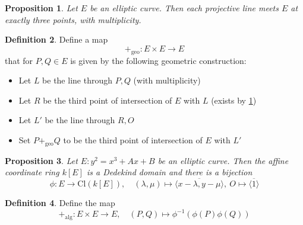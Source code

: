 \documentclass{scrartcl}
\renewcommand{\O}{O}
\newtheorem{prop}{Proposition}[section]
\theoremstyle{definition}
\newtheorem{definition}[prop]{Definition}
\begin{document}
\begin{prop}
    \label{prop:bezout_theorem_case}
    Let $E$ be an elliptic curve. Then each projective line meets $E$ at exactly three points, with multiplicity.
\end{prop}

\begin{definition}
    Define a map
    \begin{equation*}
        +_{\mathrm{geo}}: E \times E \to E
    \end{equation*}
    that for $P, Q \in E$ is given by the following geometric construction:
    \begin{itemize}
        \item Let $L$ be the line through $P, Q$ (with multiplicity)
        \item Let $R$ be the third point of intersection of $E$ with $L$ (exists by \ref{prop:bezout_theorem_case})
        \item Let $L'$ be the line through $R, \O$
        \item Set $P +_{\mathrm{geo}} Q$ to be the third point of intersection of $E$ with $L'$
    \end{itemize}
\end{definition}

\begin{prop}
    \label{prop:dedekind_domain}
    Let $E: y^2 = x^3 + Ax + B$ be an elliptic curve. Then the affine coordinate ring $k[E]$ is a Dedekind domain and there is a bijection
    \begin{equation*}
        \phi: E \to \mathrm{Cl}(k[E]), \quad (\lambda, \mu) \mapsto \overline{\langle x - \lambda, y - \mu \rangle}, \ \O \mapsto \overline{\langle 1 \rangle}
    \end{equation*}
\end{prop}

\begin{definition}
    Define the map
    \begin{equation*}
        +_{\mathrm{alg}}: E \times E \to E, \quad (P, Q) \mapsto  \phi^{-1}(\phi(P) \phi(Q))
    \end{equation*}
\end{definition}
\end{document}
